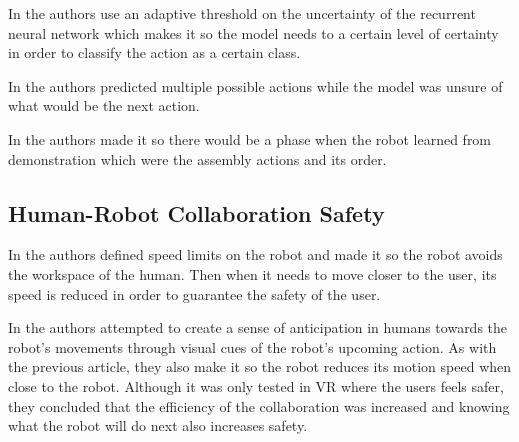 In \cite{Canuto2021} the authors use an adaptive threshold on the uncertainty of the recurrent neural network which makes it so the model needs to a certain level of certainty in order to classify the action as a certain class.

In \cite{Schydlo2018} the authors predicted multiple possible actions while the model was unsure of what would be the next action.

In \cite{Zhang2022} the authors made it so there would be a phase when the robot learned from demonstration which were the assembly actions and its order.

\subsection{Human-Robot Collaboration Safety}

In \cite{Zhang2022} the authors defined speed limits on the robot and made it so the robot avoids the workspace of the human. Then when it needs to move closer to the user, its speed is reduced in order to guarantee the safety of the user.

In \cite{Psarakis2022} the authors attempted to create a sense of anticipation in humans towards the robot's movements through visual cues of the robot's upcoming action. As with the previous article, they also make it so the robot reduces its motion speed when close to the robot. Although it was only tested in VR where the users feels safer, they concluded that the efficiency of the collaboration was increased and knowing what the robot will do next also increases safety.